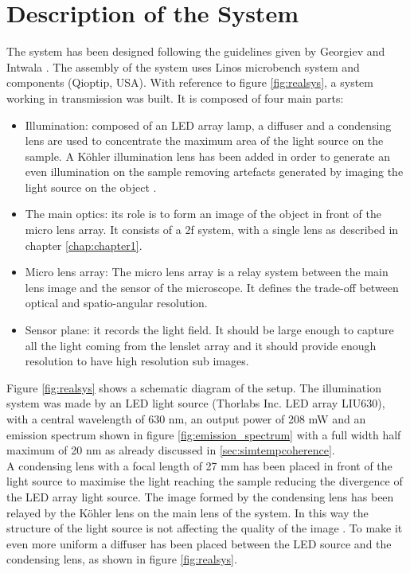 \section{Description of the System}
The system has been designed following the guidelines given by Georgiev and Intwala \cite{georgiev2006light}. The assembly of the system uses Linos microbench system and components (Qioptip, USA).
With reference to figure \ref{fig:realsys}, a system working in transmission was built. It is composed of four main parts: 
\begin{itemize}
	\item Illumination: composed of an LED array lamp, a diffuser and a condensing lens are used to concentrate the maximum area of the light source on the sample. A K\"ohler illumination lens has been added in order to generate an even illumination on the sample removing artefacts generated by imaging the light source on the object \cite{kohler1893new,kohler1934device}. 
	\item The main optics: its role is to form an image of the object in front of the micro lens array. It consists of a 2f system, with a single lens as described in chapter \ref{chap:chapter1}.
	\item Micro lens array: The micro lens array is a relay system between the main lens image and the sensor of the microscope. It defines the trade-off between optical and spatio-angular resolution.
	\item Sensor plane: it records the light field. It should be large enough to capture all the light coming from the lenslet array and it should provide enough resolution to have high resolution sub images.
\end{itemize}
Figure \ref{fig:realsys} shows a schematic diagram of the setup. The illumination system was made by an LED light source (Thorlabs Inc. LED array LIU630), with a central wavelength of 630 nm, an output power of 208 mW and an emission spectrum shown in figure \ref{fig:emission_spectrum} with a full width half maximum of 20 nm as already discussed in \ref{sec:simtempcoherence}.
\\
A condensing lens with a focal length of 27 mm has been placed in front of the light source to maximise the light reaching the sample reducing the divergence of the LED array light source. The image formed by the condensing lens has been relayed by the K\"ohler lens on the main lens of the system. In this way the structure of the light source is not affecting the quality of the image \cite{kohler1893new}. To make it even more uniform a diffuser has been placed between the LED source and the condensing lens, as shown in figure \ref{fig:realsys}.\\
